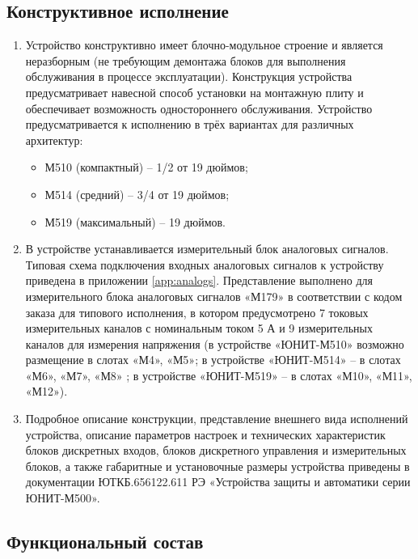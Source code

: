 \documentclass[a4paper, 12pt, table, hidelinks, DIV=calc]{extarticle}
\def\ManualUnitGeneral{ЮТКБ.656122.611 РЭ «Устройства защиты и автоматики серии ЮНИТ-М500»}
\begin{document}
\color{unidarkgreen}\subsection{Конструктивное исполнение}
\color{black}

\begin{enumerate}

\item
Устройство конструктивно имеет блочно-модульное строение и является неразборным (не требующим демонтажа блоков для выполнения обслуживания в процессе эксплуатации). 
Конструкция устройства предусматривает навесной способ установки на монтажную плиту и обеспечивает возможность одностороннего обслуживания.
Устройство предусматривается к исполнению в трёх вариантах для различных архитектур:
\begin{itemize}
\item М510 (компактный) – 1/2 от 19 дюймов;
\item М514 (средний) – 3/4 от 19 дюймов;
\item М519 (максимальный) – 19 дюймов.
\end{itemize}

\item
В устройстве устанавливается измерительный блок аналоговых сигналов. Типовая схема подключения входных аналоговых сигналов к устройству приведена в приложении \ref{app:analogs}. Представление выполнено для измерительного блока аналоговых сигналов «М179» в соответствии с кодом заказа для типового исполнения, в котором предусмотрено 7 токовых измерительных каналов с номинальным током 5 А и 9 измерительных каналов для измерения напряжения (в устройстве «ЮНИТ-М510» возможно размещение в слотах «М4», «М5»; в устройстве «ЮНИТ-М514» -- в слотах «М6», «М7», «М8» ; в устройстве «ЮНИТ-М519» -- в слотах «М10», «М11», «М12»).

\item
Подробное описание конструкции, представление внешнего вида исполнений устройства, описание параметров настроек и технических характеристик блоков дискретных входов, блоков дискретного управления и измерительных блоков, а также габаритные и установочные размеры устройства приведены в документации \ManualUnitGeneral.

\end{enumerate}

\color{unidarkgreen}\subsection{Функциональный состав}
\color{black}
\end{document}
